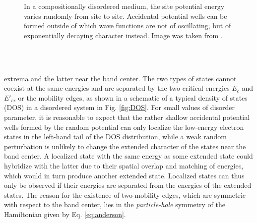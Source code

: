 \documentclass[10pt,a4paper]{article}
\begin{document}
\begin{minipage}[t]{0.4\textwidth}
\begin{figure}[H]
\caption{In a compositionally disordered medium, the site potential energy varies randomly from site to site. Accidental potential wells can be formed outside of which wave functions are not of oscillating, but of exponentially decaying character instead. Image was taken from \cite{Kramer}.}
\label{fig:accidental_wells} 
\end{figure}
\end{minipage}
\\\\
\begin{minipage}[t]{0.48\textwidth}
\noindent extrema and the latter near the band center. The two types of states cannot coexist at the same energies and are separated by the two critical energies $E_c$ and $E'_c$, or the mobility edges, as shown in a schematic of a typical density of states (DOS) in a disordered system in Fig. \ref{fig:DOS}. For small values of disorder parameter, it is reasonable to expect that the rather shallow accidental potential wells formed by the random potential can only localize the low-energy electron states in the left-hand tail of the DOS distribution, while a weak random perturbation is unlikely to change the extended character of the states near the band center. A localized state with the same energy as some extended state could hybridize with the latter due to their spatial overlap and matching of energies, which would in turn produce another extended state. Localized states can thus only be observed if their energies are separated from the energies of the extended states. The reason for the existence of two mobility edges, which are symmetric with respect to the band center, lies in the \emph{particle-hole} symmetry of the Hamiltonian given by Eq. \eqref{eq:anderson}.
\end{minipage}\hfill
\end{document}
